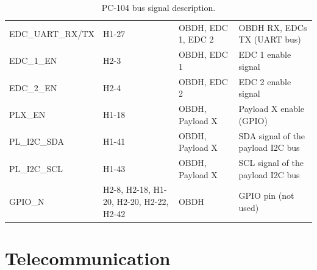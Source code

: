 \begin{table}[!h]
\begin{tabular}{lL{0.2\textwidth}L{0.15\textwidth}L{0.33\textwidth}}
        EDC\_UART\_RX/TX & H1-27           & OBDH, EDC 1, EDC 2   & OBDH RX, EDCs TX (UART bus) \\
        EDC\_1\_EN       & H2-3            & OBDH, EDC 1          & EDC 1 enable signal \\
        EDC\_2\_EN       & H2-4            & OBDH, EDC 2          & EDC 2 enable signal \\
        PLX\_EN          & H1-18           & OBDH, Payload X      & Payload X enable (GPIO) \\
        PL\_I2C\_SDA     & H1-41           & OBDH, Payload X      & SDA signal of the payload I2C bus \\
        PL\_I2C\_SCL     & H1-43           & OBDH, Payload X      & SCL signal of the payload I2C bus \\
        GPIO\_N          & H2-8, H2-18, H1-20, H2-20, H2-22, H2-42  & OBDH                 & GPIO pin (not used) \\
        \bottomrule[1.5pt]
    \end{tabular}
    \caption{PC-104 bus signal description.}
    \label{tab:pc104-signals}
\end{table}

\section{Telecommunication}

